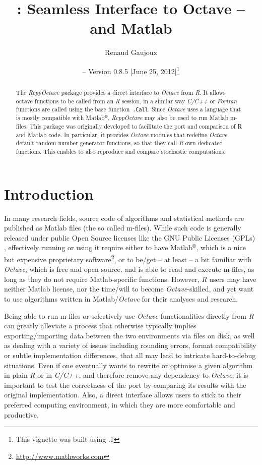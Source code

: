 \documentclass[english,10pt,a4paper]{article}\usepackage{graphicx, color}
\author{Renaud Gaujoux}
\title{\pkgname{RcppOctave}: Seamless Interface to Octave -- and Matlab}
\date{\Rpkg{RcppOctave} -- Version 0.8.5
[June 25, 2012]\footnote{This vignette was built using \octave
3.6.1}}
\newcommand{\matlab}{Matlab$^\circledR$\xspace}
\let\proglang=\textit
\let\code=\texttt
\newcommand{\pkgname}[1]{\textit{#1}\xspace}
\newcommand{\Rpkg}[1]{\pkgname{#1} package\xspace}
\newcommand{\R}{\proglang{R}\xspace}
\newcommand{\octave}{\proglang{Octave}\xspace}
\begin{document}
\maketitle

\begin{abstract}
The \Rpkg{RcppOctave} provides a direct interface to \octave from
\R.
It allows \\octave functions to be called from an \R session,
in a similar way \proglang{C/C++} or \proglang{Fortran} functions are called using the base function~\code{.Call}.
Since \octave uses a language that is mostly compatible with \matlab,
\pkgname{RcppOctave} may also be used to run Matlab m-files.
This package was originally developed to facilitate the port and comparison of R
and Matlab code.
In particular, it provides \octave modules that redefine
\octave default random number generator functions, so that they call
\proglang{R} own dedicated functions.
This enables to also reproduce and compare stochastic computations.
\end{abstract}

\noindent\hrulefill
\tableofcontents
\noindent\hrulefill

\section{Introduction}

In many research fields, source code of algorithms and statistical methods are
published as Matlab files (the so called m-files).
While such code is generally released under public Open Source licenses like the
GNU Public Licenses (GPLs) \cite{gnuGPL}, effectively running or using it
require either to have \matlab, which is a nice but expensive proprietary
software\footnote{\url{http://www.mathworks.com}}, or to be/get -- at least -- a bit familiar with \octave \cite{Eaton2002}, which is free and open source, and is able to read and execute m-files, as long as they do not require Matlab-specific functions.
However, \proglang{R} users may have neither Matlab license, nor the
time/will to become \octave-skilled, and yet want to use algorithms written in
Matlab/\octave for their analyses and research.

Being able to run m-files or selectively use \octave functionalities
directly from \proglang{R} can greatly alleviate a process that otherwise
typically implies exporting/importing data between the two environments via
files on disk, as well as dealing with a variety of issues including
rounding errors, format compatibility or subtle implementation differences,
that all may lead to intricate hard-to-debug situations.
Even if one eventually wants to rewrite or optimise a given algorithm in plain
\proglang{R} or in \proglang{C/C++}, and therefore remove any dependency to
\octave, it is important to test the correctness of the port by
comparing its results with the original implementation.
Also, a direct interface allows users to stick to their preferred computing
environment, in which they are more comfortable and productive.
\end{document}
